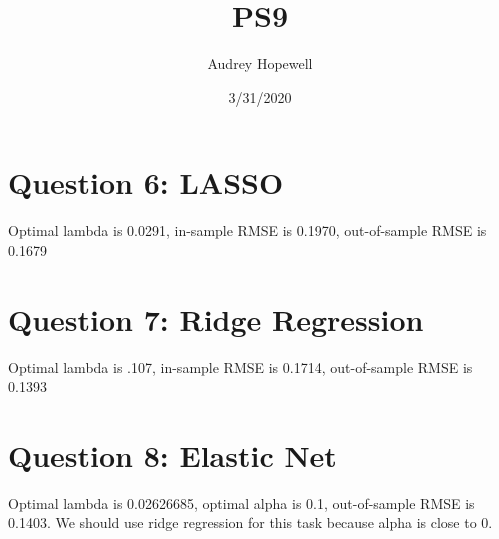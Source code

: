 \documentclass{article}
\title{PS9}
\author{Audrey Hopewell}
\date{3/31/2020}
\begin{document}
\maketitle

\section{Question 6: LASSO}
Optimal lambda is 0.0291, in-sample RMSE is 0.1970, out-of-sample RMSE is 0.1679

\section{Question 7: Ridge Regression}
Optimal lambda is .107, in-sample RMSE is 0.1714, out-of-sample RMSE is 0.1393

\section{Question 8: Elastic Net}
Optimal lambda is 0.02626685, optimal alpha is 0.1, out-of-sample RMSE is 0.1403. We should use ridge regression for this task because alpha is close to 0.
\end{document}

